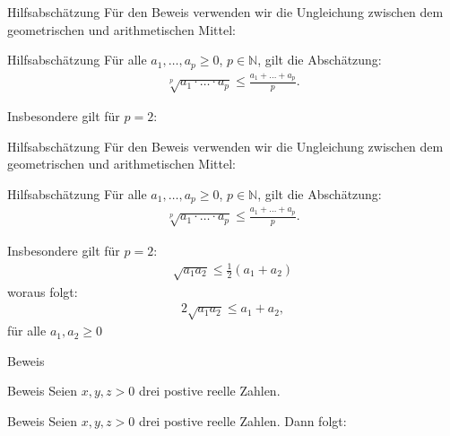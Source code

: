 \documentclass[10pt]{beamer}
\def\bN{\mathbb{N}}
\begin{document}
\begin{frame}{Hilfsabschätzung}
    Für den Beweis verwenden wir die Ungleichung zwischen dem geometrischen und arithmetischen Mittel:
    \begin{block}{Hilfsabschätzung}
        Für alle \( a_{1}, \ldots, a_{p} \geq 0 \), \( p \in \bN \), gilt die Abschätzung:
        \begin{align*}
            \sqrt[p]{a_{1} \cdot \ldots \cdot a_{p}} 
            \leq \frac{a_{1} + \ldots + a_{p}}{p}.
        \end{align*}
    \end{block}
    Insbesondere gilt für \( p = 2 \):   
\end{frame}



\begin{frame}{Hilfsabschätzung}
    Für den Beweis verwenden wir die Ungleichung zwischen dem geometrischen und arithmetischen Mittel:
    \begin{block}{Hilfsabschätzung}
        Für alle \( a_{1}, \ldots, a_{p} \geq 0 \), \( p \in \bN \), gilt die Abschätzung:
        \begin{align*}
            \sqrt[p]{a_{1} \cdot \ldots \cdot a_{p}} 
            \leq \frac{a_{1} + \ldots + a_{p}}{p}.
        \end{align*}
    \end{block}
    Insbesondere gilt für \( p = 2 \): 
    \begin{align*}
        \sqrt{a_{1} a_{2}}
        \leq \frac{1}{2} \left( a_{1} + a_{2} \right)
    \end{align*}
    woraus folgt:
    \begin{align*}
        2 \sqrt{a_{1} a_{2}}
        \leq a_{1} + a_{2}, 
    \end{align*}
    für alle \( a_{1}, a_{2} \geq 0 \)
\end{frame}



\begin{frame}{Beweis}
    
\end{frame}



\begin{frame}{Beweis}
    Seien \( x, y, z > 0 \) drei postive reelle Zahlen.
\end{frame}



\begin{frame}{Beweis}
    Seien \( x, y, z > 0 \) drei postive reelle Zahlen. Dann folgt:
\end{frame}
\end{document}
